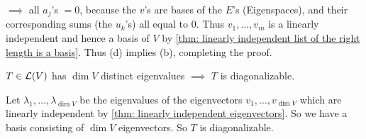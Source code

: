 \begin{prf}
  $\implies$ all $a_j$'s $=0$, because the $v$'s are bases of the $E$'s  (Eigenspaces), and their corresponding sums (the $u_k$'s) all equal to $0$. Thus $v_1, \ldots, v_m$ is a linearly independent and hence a basis of $V$ by \ref{thm: linearly independent list of the right length is a basis}. Thus (d) implies (b), completing the proof.
\end{prf}

\setcounter{thm}{57}
\begin{thm} 
  \label{thm: enough eigenvalues implies diagonalizability}
  $T\in \mathcal{L}(V)$ has $\dim V$ distinct eigenvalues $\implies$ $T$ is diagonalizable.
\end{thm}
\begin{prf}
  Let $\lambda_1, \ldots, \lambda_{\dim V}$ be the eigenvalues of the eigenvectors $v_1, \ldots, v_{\dim V}$ which are linearly independent by \autoref{thm: linearly independent eigenvectors}. So we have a basis consisting of $\dim V$ eigenvectors. So $T$ is diagonalizable.
\end{prf}

